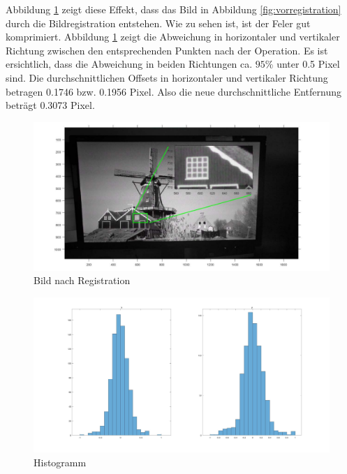 Abbildung \ref{fig:Bild nach Registration} zeigt diese Effekt, dass das Bild in Abbildung \ref{fig:vorregistration} durch die Bildregistration entstehen. Wie zu sehen ist, ist der Feler gut komprimiert. Abbildung \ref{fig:Bild nach Registration} zeigt die Abweichung in horizontaler und vertikaler Richtung zwischen den entsprechenden Punkten nach der Operation. Es ist ersichtlich, dass die Abweichung in beiden Richtungen ca. $ 95\% $  unter 0.5 Pixel sind. Die durchschnittlichen Offsets in horizontaler und vertikaler Richtung betragen 0.1746 bzw. 0.1956 Pixel. Also die neue durchschnittliche Entfernung beträgt 0.3073 Pixel. 

\begin{figure}[H]
 \centering 
  \includegraphics[keepaspectratio,width=1.00\textwidth]{images/5_Implementirung/nachregis.pdf}
 \caption{Bild nach Registration}
 \label{fig:Bild nach Registration}
\end{figure}


\begin{figure}[H]
 \centering 
  \includegraphics[keepaspectratio,width=1.0\textwidth]{images/6_Auswertung/histogramregistration1_8.pdf}
 \caption{Histogramm}
 \label{fig:Histogrammfr}
\end{figure}

